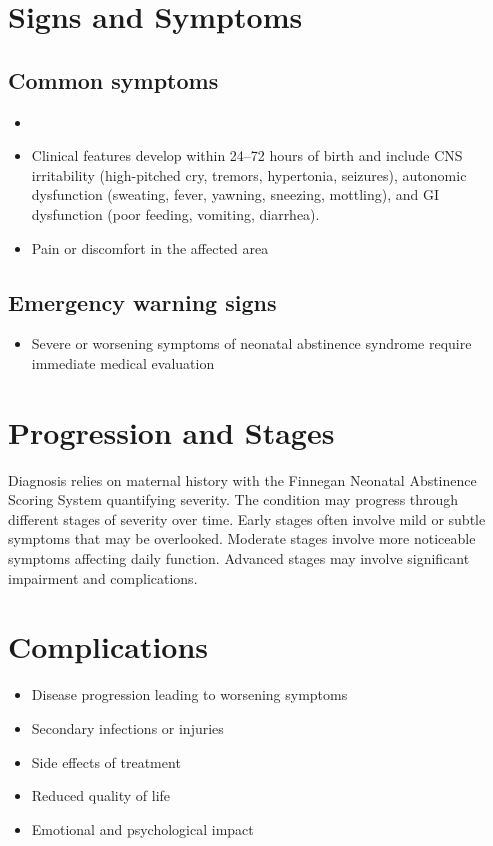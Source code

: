 \section{Signs and Symptoms}

\subsection{Common symptoms}
\begin{itemize}[noitemsep]
  \item \item Clinical features develop within 24--72 hours of birth and include CNS irritability (high-pitched cry, tremors, hypertonia, seizures), autonomic dysfunction (sweating, fever, yawning, sneezing, mottling), and GI dysfunction (poor feeding, vomiting, diarrhea).

  \item Pain or discomfort in the affected area
  \end{itemize}

\subsection{Emergency warning signs}
\begin{itemize}[noitemsep]
  \item Severe or worsening symptoms of neonatal abstinence syndrome require immediate medical evaluation
\end{itemize}
\section{Progression and Stages}
Diagnosis relies on maternal history with the Finnegan Neonatal Abstinence Scoring System quantifying severity. The condition may progress through different stages of severity over time. Early stages often involve mild or subtle symptoms that may be overlooked. Moderate stages involve more noticeable symptoms affecting daily function. Advanced stages may involve significant impairment and complications.
\section{Complications}
\begin{itemize}[noitemsep]
  \item Disease progression leading to worsening symptoms
  \item Secondary infections or injuries
  \item Side effects of treatment
  \item Reduced quality of life
  \item Emotional and psychological impact
\end{itemize}

